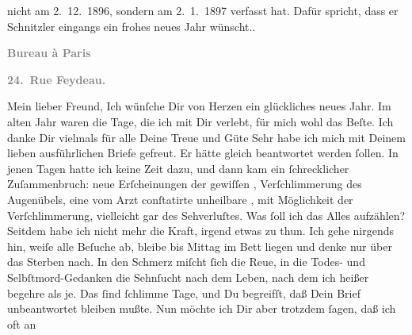 \begin{ledgroupsized}[t]{13cm}
{{{                        nicht am 2. 12. 1896, sondern am 2. 1. 1897 verfasst hat. Dafür spricht, dass er
                           Schnitzler eingangs ein frohes
                        neues Jahr wünscht.}}}\label{K_L02792-1h}.\pend
           \pstart
           \begin{otherlanguage}{french}\textcolor{gray}{\textbf{\textbf{Bureau à Paris}}}\end{otherlanguage}\pend
           \pstart
           \begin{otherlanguage}{french}\textcolor{gray}{\textbf{\textbf{24. Rue Feydeau.}}}\end{otherlanguage}\pend
           \pstart{}Mein lieber Freund,\pend\pstart
           Ich wünſche Dir von Herzen ein glückliches neues Jahr. Im
               alten Jahr waren die Tage, die ich mit Dir verlebt, für mich
               wohl das Beſte. Ich danke Dir \strikeout{\textcolor{gray}{×}\-\textcolor{gray}{×}\-\textcolor{gray}{×}} vielmals für alle Deine Treue und Güte{\dotsseven}\pend
           \pstart
           Sehr habe ich mich mit Deinem lieben ausführlichen Briefe gefreut. Er hätte gleich
               beantwortet werden ſollen. In jenen Tagen hatte ich keine Zeit dazu, und dann kam ein
               ſchrecklicher  Zuſammenbruch: neue Erſcheinungen der gewiſſen \label{K_L02792-2v}\label{K_L02792-2h}, Verſchlimmerung des Augenübels, eine vom Arzt
               conſtatirte unheilbare \label{K_L02792-3v}\label{K_L02792-3h}, {\pb}mit Möglichkeit der Verſchlimmerung, vielleicht gar
               des Sehverluſtes. Was ſoll ich das Alles aufzählen? Seitdem habe ich nicht mehr die
               Kraft, irgend etwas zu thun. Ich gehe nirgends hin, weiſe alle Beſuche ab, bleibe bis
                  Mittag im Bett liegen und denke nur über das Sterben nach. In den
               Schmerz miſcht ſich die Reue, in die Todes- und Selbſtmord-Gedanken die Sehnſucht
               nach dem Leben, nach dem ich heißer begehre als je. Das ſind ſchlimme Tage, und Du
               begreifſt, daß  Dein Brief
               unbeantwortet bleiben mußte. Nun möchte ich Dir aber trotzdem ſagen, daß ich oft an

\end{ledgroupsized}
